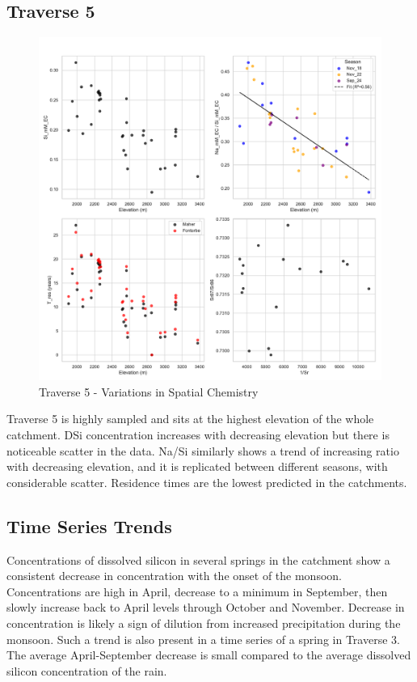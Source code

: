 \subsection{Traverse 5}

\begin{figure}[h]
    \centering
        \includegraphics[width=\textwidth]{Traverse_5_summary.pdf}
    \caption{Traverse 5 - Variations in Spatial Chemistry}
    \label{fig:spatial_changes_spring5}
\end{figure}

\FloatBarrier

Traverse 5 is highly sampled and sits at the highest elevation of the whole catchment. DSi concentration increases with decreasing elevation but there is noticeable scatter in the data. Na/Si similarly shows a trend of increasing ratio with decreasing elevation, and it is replicated between different seasons, with considerable scatter. Residence times are the lowest predicted in the catchments.



\subsection{Time Series Trends}

Concentrations of dissolved silicon in several springs in the catchment show a consistent decrease in concentration with the onset of the monsoon. Concentrations are high in April, decrease to a minimum in September, then slowly increase back to April levels through October and November. Decrease in concentration is likely a sign of dilution from increased precipitation during the monsoon. Such a trend is also present in a time series of a spring in Traverse 3. The average April-September decrease is small compared to the average dissolved silicon concentration of the rain.


